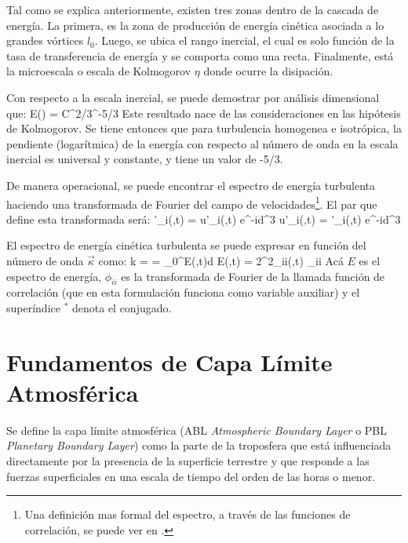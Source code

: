 Tal como se explica anteriormente, existen tres zonas dentro de la cascada de energía. La primera, es la zona de producción de energía cinética asociada a lo grandes vórtices $l_0$. Luego, se ubica el rango inercial, el cual es solo función de la tasa de transferencia de energía y se comporta como una recta. Finalmente, está la microescala o escala de Kolmogorov $\eta$ donde ocurre la disipación.

Con respecto a la escala inercial, se puede demostrar por análisis dimensional que:
\be E(\kappa) = C\varepsilon^{2/3}\kappa^{-5/3} \ee
Este resultado nace de las consideraciones en las hipótesis de Kolmogorov. Se tiene entonces que para turbulencia homogenea e isotrópica, la pendiente (logarítmica) de la energía con respecto al número de onda en la escala inercial es universal y constante, y tiene un valor de -5/3.

De manera operacional, se puede encontrar el espectro de energía turbulenta haciendo una transformada de Fourier del campo de velocidades\footnote{Una definición mas formal del espectro, a través de las funciones de correlación, se puede ver en \cite{9780521775380}.}. El par que define esta transformada será:
\be {}'_i(\vec{\kappa},t) = \int u'_i(,t) e^{-i\vec{\kappa}\cdot{}}d^3 \ee
\be u'_i(,t) = \int {}'_i(\vec{\kappa},t) e^{-i\vec{\kappa}\cdot{}}d^3\vec{\kappa} \ee

El espectro de energía cinética turbulenta se puede expresar en función del número de onda $\vec{\kappa}$ como:
\be 
k =  = \int\limits_0^\infty E(\kappa,t)d\kappa
\ee
\be
E(\kappa,t) = 2\pi\kappa^2\phi_{ii}(\kappa,t)
\ee 
\be 
\phi_{ii} \approx {}
\ee
Acá $E$ es el espectro de energía, $\phi_{ii}$ es la transformada de Fourier de la llamada función de correlación (que en esta formulación funciona como variable auxiliar) y el superíndice $^*$ denota el conjugado.

\newpage 
\section{Fundamentos de Capa Límite Atmosférica}
Se define la capa límite atmosférica (ABL \emph{Atmospheric Boundary Layer} o PBL \emph{Planetary Boundary Layer}) como la parte de la troposfera que está influenciada directamente por la presencia de la superficie terrestre y que responde a las fuerzas superficiales en una escala de tiempo del orden de las horas o menor.

